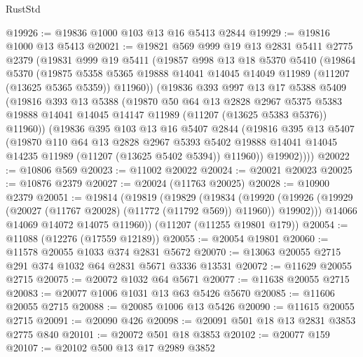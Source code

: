 \begin{lexlean}{RustStd}
\begin{coremodule}
@19926 := @19836 @1000 @103 @13 @16 @5413 @2844
@19929 := @19816 @1000 @13 @5413
@20021 := @19821
    @569
    @999
    @19
    @13
    @2831
    @5411
    @2775
    @2379
    (@19831
      @999
      @19
      @5411
      (@19857
        @998
        @13
        @18
        @5370
        @5410
        (@19864
          @5370
          (@19875
            @5358
            @5365
            @19888
            @14041
            @14045
            @14049
            @11989
            (@11207 (@13625 @5365 @5359))
            @11960))
        (@19836
          @393
          @997
          @13
          @17
          @5388
          @5409
          (@19816
            @393
            @13
            @5388
            (@19870
              @50
              @64
              @13
              @2828
              @2967
              @5375
              @5383
              @19888
              @14041
              @14045
              @14147
              @11989
              (@11207 (@13625 @5383 @5376))
              @11960))
          (@19836
            @395
            @103
            @13
            @16
            @5407
            @2844
            (@19816
              @395
              @13
              @5407
              (@19870
                @110
                @64
                @13
                @2828
                @2967
                @5393
                @5402
                @19888
                @14041
                @14045
                @14235
                @11989
                (@11207 (@13625 @5402 @5394))
                @11960))
            @19902))))
@20022 := @10806 @569
@20023 := @11002 @20022
@20024 := @20021 @20023
@20025 := @10876 @2379
@20027 := @20024 (@11763 @20025)
@20028 := @10900 @2379
@20051 := @19814
    (@19819
      (@19829
        (@19834
          (@19920 (@19926 (@19929 (@20027 (@11767 @20028) (@11772 (@11792 @569)) @11960)) @19902)))
        @14066
        @14069
        @14072
        @14075
        @11960))
    (@11207 (@11255 @19801 @179))
@20054 := @11088 (@12276 (@17559 @12189))
@20055 := @20054 @19801
@20060 := @11578 @20055 @1033 @374 @2831 @5672
@20070 := @13063 @20055 @2715 @291 @374 @1032 @64 @2831 @5671 @3336 @13531
@20072 := @11629 @20055 @2715
@20075 := @20072 @1032 @64 @5671
@20077 := @11638 @20055 @2715
@20083 := @20077 @1006 @1031 @13 @63 @5426 @5670
@20085 := @11606 @20055 @2715
@20088 := @20085 @1006 @13 @5426
@20090 := @11615 @20055 @2715
@20091 := @20090 @426
@20098 := @20091 @501 @18 @13 @2831 @3853 @2775 @840
@20101 := @20072 @501 @18 @3853
@20102 := @20077 @159
@20107 := @20102 @500 @13 @17 @2989 @3852

\end{coremodule}
\end{lexlean}
